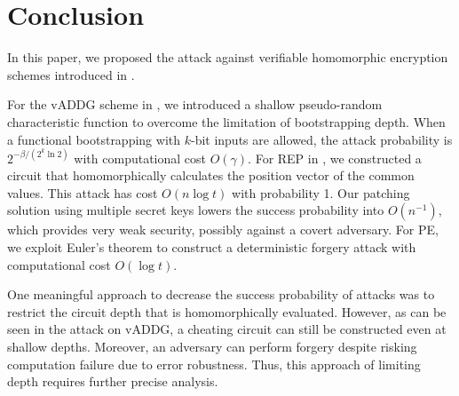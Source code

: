 \documentclass[runningheads]{llncs}
\newcommand{\REP}{\textsf{REP}{}}
\newcommand{\PE}{\textsf{PE}{}}
\newcommand{\enc}{\textsf{Enc}}
\begin{document}

        
\section{Conclusion}
In this paper, we proposed the attack against verifiable homomorphic encryption schemes introduced in \cite{VE, cryptoeprint:PRF}.

For the vADDG scheme in \cite{cryptoeprint:PRF}, we introduced a shallow pseudo-random characteristic function to overcome the limitation of bootstrapping depth. When a functional bootstrapping with $k$-bit inputs are allowed, the attack probability is $2^{-\beta/(2^k\ln 2)}$ with computational cost $O(\gamma)$. 
For \REP{} in \cite{VE}, we constructed a circuit that homomorphically calculates the position vector of the common values. This attack has cost $O(n\log t)$ with probability 1. 
Our patching solution using multiple secret keys lowers the success probability into \(O(n^{-1})\), which provides very weak security, possibly against a covert adversary.
For \PE{}, we exploit Euler's theorem to construct a deterministic forgery attack with computational cost $O(\log t)$.

One meaningful approach to decrease the success probability of attacks was to restrict the circuit depth that is homomorphically evaluated. However, as can be seen in the attack on vADDG, a cheating circuit can still be constructed even at shallow depths. Moreover, an adversary can perform forgery despite risking computation failure due to error robustness. Thus, this approach of limiting depth requires further precise analysis.
\end{document}

